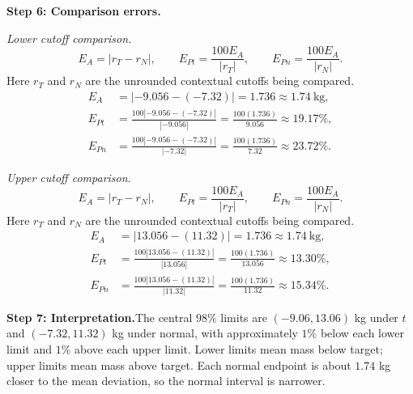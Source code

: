 \begin{enumerate}[leftmargin=*,label=\textbf{\arabic*.},itemsep=12pt,parsep=3pt,topsep=5pt]
\begin{minipage}{\linewidth}
\end{minipage}\par
\par\textbf{Step 6: Comparison errors.}\nopagebreak\enspace \par\noindent\begin{minipage}{\linewidth}
\par\textit{Lower cutoff comparison.}
\[
E_A=|r_T-r_N|,\qquad E_{Pt}=\frac{100E_A}{|r_T|},\qquad E_{Pn}=\frac{100E_A}{|r_N|}.
\]
Here $r_T$ and $r_N$ are the unrounded contextual cutoffs being compared.
\[
\begin{aligned}
E_A&=|-9.056-(-7.32)|=1.736\approx 1.74\ \text{kg},\\
E_{Pt}&=\frac{100|-9.056-(-7.32)|}{|-9.056|}=\frac{100(1.736)}{9.056}\approx 19.17\%,\\
E_{Pn}&=\frac{100|-9.056-(-7.32)|}{|-7.32|}=\frac{100(1.736)}{7.32}\approx 23.72\%.
\end{aligned}
\]
\end{minipage}\par
\par\noindent\begin{minipage}{\linewidth}
\par\textit{Upper cutoff comparison.}
\[
E_A=|r_T-r_N|,\qquad E_{Pt}=\frac{100E_A}{|r_T|},\qquad E_{Pn}=\frac{100E_A}{|r_N|}.
\]
Here $r_T$ and $r_N$ are the unrounded contextual cutoffs being compared.
\[
\begin{aligned}
E_A&=|13.056-(11.32)|=1.736\approx 1.74\ \text{kg},\\
E_{Pt}&=\frac{100|13.056-(11.32)|}{|13.056|}=\frac{100(1.736)}{13.056}\approx 13.30\%,\\
E_{Pn}&=\frac{100|13.056-(11.32)|}{|11.32|}=\frac{100(1.736)}{11.32}\approx 15.34\%.
\end{aligned}
\]
\end{minipage}\par

\par\noindent\begin{minipage}{\linewidth}
\par\textbf{Step 7: Interpretation.}\nopagebreak\enspace The central $98\%$ limits are $(-9.06,13.06)$ kg under $t$ and $(-7.32,11.32)$ kg under normal, with approximately $1\%$ below each lower limit and $1\%$ above each upper limit. Lower limits mean mass below target; upper limits mean mass above target. Each normal endpoint is about $1.74$ kg closer to the mean deviation, so the normal interval is narrower.
\end{minipage}\par
\end{enumerate}
\endgroup

